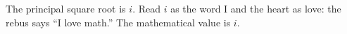 The principal square root is $ i $. Read $ i $ as the word I and the heart as love: the rebus says ``I love math.'' The mathematical value is $\boxed i $.
